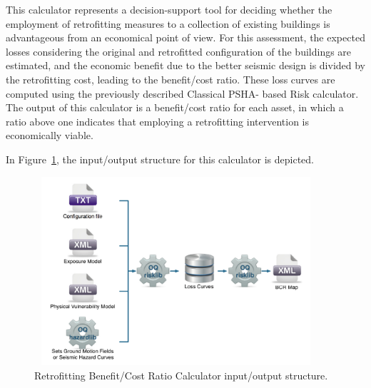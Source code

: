 This calculator represents a decision-support tool for deciding whether the
employment of retrofitting measures to a collection of existing buildings is
advantageous from an economical point of view. For this assessment, the
expected losses considering the original and retrofitted configuration of the
buildings are estimated, and the economic benefit due to the better seismic
design is divided by the retrofitting cost, leading to the benefit/cost ratio.
These loss curves are computed using the previously described Classical PSHA-
based Risk calculator. The output of this calculator is a benefit/cost ratio
for each asset, in which a ratio above one indicates that employing a
retrofitting intervention is economically viable.

In Figure~\ref{fig:io-structure-benefit-cost}, the input/output structure for
this calculator is depicted.

\begin{figure}[ht]
\centering
\includegraphics[width=10.5cm,height=7cm]{figures/risk/io-structure-benefit-cost.pdf}
\caption{Retrofitting Benefit/Cost Ratio Calculator input/output structure.}
\label{fig:io-structure-benefit-cost}
\end{figure}